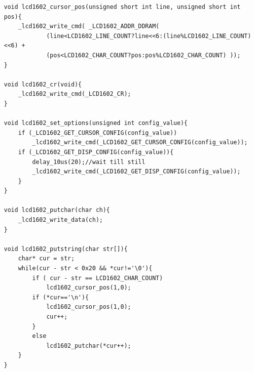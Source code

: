 \documentclass[a4paper]{ctexart}
\begin{document}
\begin{lstlisting}[caption={File lcd1602\_driver.c},label={lcd1602dc}]
void lcd1602_cursor_pos(unsigned short int line, unsigned short int pos){
	_lcd1602_write_cmd( _LCD1602_ADDR_DDRAM( 
			(line<LCD1602_LINE_COUNT?line<<6:(line%LCD1602_LINE_COUNT)<<6) + 
			(pos<LCD1602_CHAR_COUNT?pos:pos%LCD1602_CHAR_COUNT) ));
}

void lcd1602_cr(void){
	_lcd1602_write_cmd(_LCD1602_CR);
}

void lcd1602_set_options(unsigned int config_value){
	if (_LCD1602_GET_CURSOR_CONFIG(config_value))
		_lcd1602_write_cmd(_LCD1602_GET_CURSOR_CONFIG(config_value));
	if (_LCD1602_GET_DISP_CONFIG(config_value)){
		delay_10us(20);//wait till still
		_lcd1602_write_cmd(_LCD1602_GET_DISP_CONFIG(config_value));
	}
}

void lcd1602_putchar(char ch){
	_lcd1602_write_data(ch);
}

void lcd1602_putstring(char str[]){
	char* cur = str;
	while(cur - str < 0x20 && *cur!='\0'){
		if ( cur - str == LCD1602_CHAR_COUNT)
			lcd1602_cursor_pos(1,0);
		if (*cur=='\n'){
			lcd1602_cursor_pos(1,0);
			cur++;
		}
		else
			lcd1602_putchar(*cur++);
	}
}
\end{lstlisting}
\end{document}
